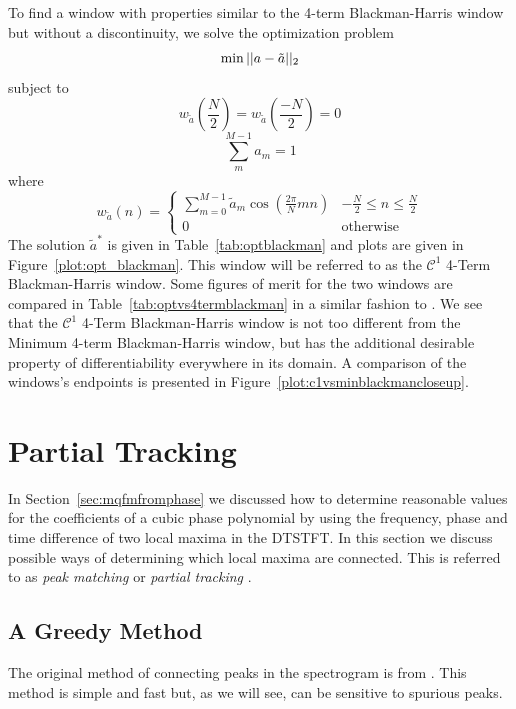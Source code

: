 To find a window with properties similar to the 4-term Blackman-Harris window
but without a discontinuity, we solve the optimization problem
\[
        \min||a-\tilde{a}||_2 \\
\]
subject to
\[
        w_{\tilde{a}} \left( \frac{N}{2} \right)
            = w_{\tilde{a}} \left( \frac{-N}{2} \right) = 0
\]
\[
        \sum_{m}^{M-1} a_{m} = 1
\]
where
\[
    w_{\tilde{a}}(n) = \begin{cases}
        \sum_{m=0}^{M-1}\tilde{a}_{m}\cos \left( \frac{2\pi}{N}mn \right) & -\frac{N}{2} \leq n
        \leq \frac{N}{2} \\
        0 & \text{otherwise}
    \end{cases}
\]
The solution $\tilde{a}^{\ast}$ is given in Table~\ref{tab:optblackman} and
plots are given in Figure~\ref{plot:opt_blackman}. This window will be referred
to as the $\mathcal{C}^{1}$ 4-Term Blackman-Harris window. Some figures of merit
for the two windows are compared in Table~\ref{tab:optvs4termblackman} in a similar
fashion to \cite{harris1978use}. We see
that the $\mathcal{C}^{1}$ 4-Term Blackman-Harris window is not too different
from the Minimum 4-term Blackman-Harris window, but has the additional
desirable property of differentiability everywhere in its domain. A comparison
of the windows's endpoints is presented in
Figure~\ref{plot:c1vsminblackmancloseup}.

\section{Partial Tracking\label{sec:partialtracking}}

In Section~\ref{sec:mqfmfromphase} we discussed how to determine reasonable
values for the coefficients of a cubic phase polynomial by using the frequency,
phase and time difference of two local maxima in the DTSTFT. In this section we
discuss possible ways of determining which local maxima are connected. This is
referred to as \textit{peak matching} \cite{mcaulay1986speech}
or \textit{partial tracking} \cite{smith1987parshl} \cite{depalle1993tracking}.

\subsection{A Greedy Method}

The original method of connecting peaks in the spectrogram is from
\cite{mcaulay1986speech}. This method is simple and fast but, as we will see,
can be sensitive to spurious peaks.

